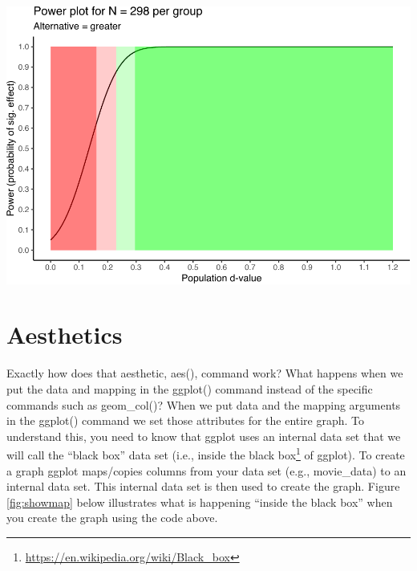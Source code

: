 \documentclass[
]{krantz}
\renewcommand{\href}[2]{#2\footnote{\url{#1}}}
\begin{document}
\includegraphics{bookdown_files/figure-latex/unnamed-chunk-242-1.pdf}

\hypertarget{aesthetics}{%
\section{Aesthetics}\label{aesthetics}}

Exactly how does that aesthetic, aes(), command work? What happens when we put the data and mapping in the ggplot() command instead of the specific commands such as geom\_col()? When we put data and the mapping arguments in the ggplot() command we set those attributes for the entire graph. To understand this, you need to know that ggplot uses an internal data set that we will call the ``black box'' data set (i.e., inside the \href{https://en.wikipedia.org/wiki/Black_box}{black box} of ggplot). To create a graph ggplot maps/copies columns from your data set (e.g., movie\_data) to an internal data set. This internal data set is then used to create the graph. Figure \ref{fig:showmap} below illustrates what is happening ``inside the black box'' when you create the graph using the code above.
\end{document}
